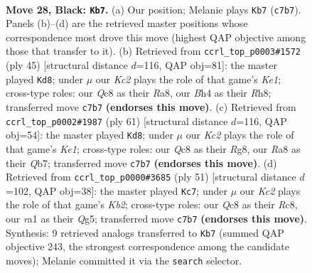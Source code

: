 \documentclass[11pt]{article}
\begin{document}
\clearpage

\begin{figure}[p]\centering
\begin{subfigure}{0.46\textwidth}\centering
\resizebox{\linewidth}{!}{%
\newchessgame
\chessboard[
  setfen={r1q4r/p1k2pp1/5n1p/5P1P/B2Q1B1b/8/4K1p1/R5N1 b - - 3 28},
  showmover=false,
  pgfstyle=straightmove, color=movearrow, markmove={c7-b7}
]}
\caption{}
\end{subfigure}\hfill
\begin{subfigure}{0.46\textwidth}\centering
\resizebox{\linewidth}{!}{%
\newchessgame
\chessboard[
  setfen={r3k2r/1p1nb2p/p1p2q2/2P4B/1P1NQ3/8/P4PP1/3RK3 b kq - 2 23},
  showmover=false,
  pgfstyle=straightmove, color=movearrow, markmove={e8-d8}
]}
\caption{}
\end{subfigure}
\\[4pt]
\begin{subfigure}{0.46\textwidth}\centering
\resizebox{\linewidth}{!}{%
\newchessgame
\chessboard[
  setfen={r3k1r1/1q3p2/p3p2p/2b1PP1Q/B2p4/8/1P2N3/1K5R b q - 3 31},
  showmover=false,
  pgfstyle=straightmove, color=movearrow, markmove={e8-d8}
]}
\caption{}
\end{subfigure}\hfill
\begin{subfigure}{0.46\textwidth}\centering
\resizebox{\linewidth}{!}{%
\newchessgame
\chessboard[
  setfen={2r5/1k6/2npbp2/4p1qp/Q6N/P2PP1r1/5KB1/BR6 b - - 1 26},
  showmover=false,
  pgfstyle=straightmove, color=movearrow, markmove={b7-c7}
]}
\caption{}
\end{subfigure}
\caption{\textbf{Move 28, Black: \texttt{Kb7}.} (a) Our position; Melanie plays \texttt{Kb7} (\texttt{c7b7}). Panels (b)--(d) are the retrieved master positions whose correspondence most drove this move (highest QAP objective among those that transfer to it). (b) Retrieved from \texttt{ccrl\_top\_p0003\#1572} (ply 45) [structural distance $d$=116, QAP obj=81]: the master played \texttt{Kd8}; under $\mu$ our \emph{Kc2} plays the role of that game's \emph{Ke1}; cross-type roles: our \emph{Q}c8 as their \emph{R}a8, our \emph{B}h4 as their \emph{R}h8; transferred move \texttt{c7b7} \textbf{(endorses this move)}. (c) Retrieved from \texttt{ccrl\_top\_p0002\#1987} (ply 61) [structural distance $d$=116, QAP obj=54]: the master played \texttt{Kd8}; under $\mu$ our \emph{Kc2} plays the role of that game's \emph{Ke1}; cross-type roles: our \emph{Q}c8 as their \emph{R}g8, our \emph{R}a8 as their \emph{Q}b7; transferred move \texttt{c7b7} \textbf{(endorses this move)}. (d) Retrieved from \texttt{ccrl\_top\_p0000\#3685} (ply 51) [structural distance $d$=102, QAP obj=38]: the master played \texttt{Kc7}; under $\mu$ our \emph{Kc2} plays the role of that game's \emph{Kb2}; cross-type roles: our \emph{Q}c8 as their \emph{R}c8, our \emph{r}a1 as their \emph{Q}g5; transferred move \texttt{c7b7} \textbf{(endorses this move)}. Synthesis: 9 retrieved analogs transferred to \texttt{Kb7} (summed QAP objective 243, the strongest correspondence among the candidate moves); Melanie committed it via the \texttt{search} selector.}
\label{fig:thought-m55}
\end{figure}
\end{document}
